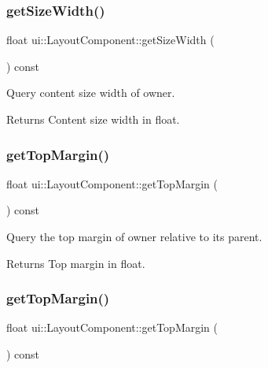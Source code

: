 \subsubsection{\texorpdfstring{get\+Size\+Width()}{getSizeWidth()}\hspace{0.1cm}{\footnotesize\ttfamily [2/2]}}
{\footnotesize\ttfamily float ui\+::\+Layout\+Component\+::get\+Size\+Width (\begin{DoxyParamCaption}{ }\end{DoxyParamCaption}) const}

Query content size width of owner. \begin{DoxyReturn}{Returns}
Content size width in float. 
\end{DoxyReturn}
\mbox{\label{classui_1_1LayoutComponent_a21749ecc8ce29be5518a54328f7508d8}} 
\subsubsection{\texorpdfstring{get\+Top\+Margin()}{getTopMargin()}\hspace{0.1cm}{\footnotesize\ttfamily [1/2]}}
{\footnotesize\ttfamily float ui\+::\+Layout\+Component\+::get\+Top\+Margin (\begin{DoxyParamCaption}{ }\end{DoxyParamCaption}) const}

Query the top margin of owner relative to its parent. \begin{DoxyReturn}{Returns}
Top margin in float. 
\end{DoxyReturn}
\mbox{\label{classui_1_1LayoutComponent_a21749ecc8ce29be5518a54328f7508d8}} 
\subsubsection{\texorpdfstring{get\+Top\+Margin()}{getTopMargin()}\hspace{0.1cm}{\footnotesize\ttfamily [2/2]}}
{\footnotesize\ttfamily float ui\+::\+Layout\+Component\+::get\+Top\+Margin (\begin{DoxyParamCaption}{ }\end{DoxyParamCaption}) const}

